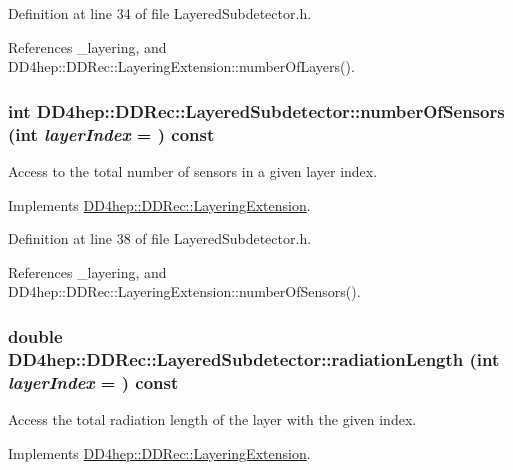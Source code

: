 Definition at line 34 of file LayeredSubdetector.h.

References \_\-layering, and DD4hep::DDRec::LayeringExtension::numberOfLayers().\hypertarget{class_d_d4hep_1_1_d_d_rec_1_1_layered_subdetector_a3182cb0593f3a49c5cc10b0befffbe31}{
\subsubsection[{numberOfSensors}]{\setlength{\rightskip}{0pt plus 5cm}int DD4hep::DDRec::LayeredSubdetector::numberOfSensors (int {\em layerIndex} = {}) const}}
\label{class_d_d4hep_1_1_d_d_rec_1_1_layered_subdetector_a3182cb0593f3a49c5cc10b0befffbe31}


Access to the total number of sensors in a given layer index. 

Implements \hyperlink{class_d_d4hep_1_1_d_d_rec_1_1_layering_extension_a91d00c26112a0456117d1036db335e5d}{DD4hep::DDRec::LayeringExtension}.

Definition at line 38 of file LayeredSubdetector.h.

References \_\-layering, and DD4hep::DDRec::LayeringExtension::numberOfSensors().\hypertarget{class_d_d4hep_1_1_d_d_rec_1_1_layered_subdetector_a0c551dbd2e52032cf7a70e9b2dd457b4}{
\subsubsection[{radiationLength}]{\setlength{\rightskip}{0pt plus 5cm}double DD4hep::DDRec::LayeredSubdetector::radiationLength (int {\em layerIndex} = {}) const}}
\label{class_d_d4hep_1_1_d_d_rec_1_1_layered_subdetector_a0c551dbd2e52032cf7a70e9b2dd457b4}


Access the total radiation length of the layer with the given index. 

Implements \hyperlink{class_d_d4hep_1_1_d_d_rec_1_1_layering_extension_adf915de4949eb6f0406045b4b38dd469}{DD4hep::DDRec::LayeringExtension}.

